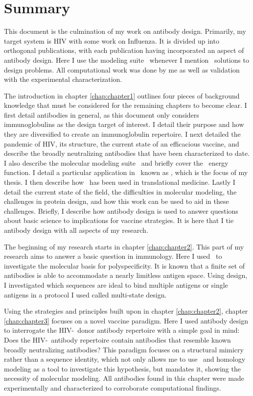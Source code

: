 \chapter*{Summary}
\vspace{7mm}
This document is the culmination of my work on antibody design. Primarily, my target system is HIV with some work on Influenza. It is divided up into orthogonal publications, with each publication having incorporated an aspect of antibody design. Here I use the modeling suite \rosetta~whenever I mention \silico~solutions to design problems. All computational work was done by me as well as validation with the experimental characterization.

The introduction in chapter \ref{chap:chapter1} outlines four pieces of background knowledge that must be considered for the remaining chapters to become clear. I first detail antibodies in general, as this document only considers immunoglobulins as the design target of interest. I detail their purpose and how they are diversified to create an immunoglobulin repertoire. I next detailed the pandemic of HIV, its structure, the current state of an efficacious vaccine, and describe the broadly neutralizing antibodies that have been characterized to date. I also describe the molecular modeling suite \rosetta~and briefly cover the \rosetta~energy function. I detail a particular application in \rosetta~known as \rosettadesign, which is the focus of my thesis. I then describe how \rosettadesign~has been used in translational medicine. Lastly I detail the current state of the field, the difficulties in molecular modeling, the challenges in protein design, and how this work can be used to aid in these challenges. Briefly, I describe how antibody design is used to answer questions about basic science to implications for vaccine strategies. It is here that I tie antibody design with all aspects of my research.

The beginning of my research starts in chapter \ref{chap:chapter2}. This part of my research aims to answer a basic question in immunology. Here I used \rosettadesign~to investigate the molecular basis for polyspecificity. It is known that a finite set of antibodies is able to accommodate a nearly limitless antigen space. Using design, I investigated which sequences are ideal to bind multiple antigens or single antigens in a protocol I used called multi-state design.

Using the strategies and principles built upon in chapter \ref{chap:chapter2}, chapter \ref{chap:chapter3} focuses on a novel vaccine paradigm. Here I used antibody design to interrogate the HIV-\naive~donor antibody repertoire with a simple goal in mind: Does the HIV-\naive~antibody repertoire contain antibodies that resemble known broadly neutralizing antibodies? This paradigm focuses on a structural mimicry rather than a sequence identity, which not only allows me to use \rosettadesign~and homology modeling as a tool to investigate this hypothesis, but mandates it, showing the necessity of molecular modeling. All antibodies found in this chapter were made experimentally and characterized to corroborate computational findings.

